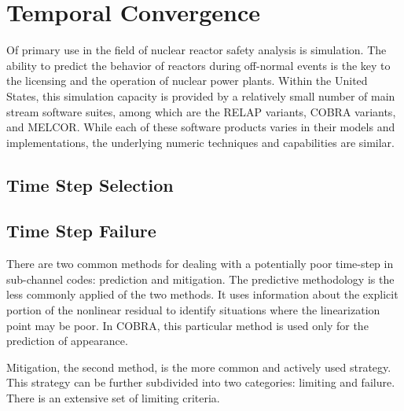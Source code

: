 \section{Temporal Convergence}
\label{sect:temporal_convergence}
Of primary use in the field of nuclear reactor safety analysis is simulation.
The ability to predict the behavior of reactors during off-normal events is the key to the licensing and the operation of nuclear power plants.
Within the United States, this simulation capacity is provided by a relatively small number of main stream software suites, among which are the RELAP variants, COBRA variants, and MELCOR.
While each of these software products varies in their models and implementations, the underlying numeric techniques and capabilities are similar.

\subsection{Time Step Selection}
\label{subsect:time_step_selection}

\subsection{Time Step Failure}
\label{subsect:time_step_failure}
There are two common methods for dealing with a potentially poor time-step in sub-channel codes: prediction and mitigation.
The predictive methodology is the less commonly applied of the two methods.
It uses information about the explicit portion of the nonlinear residual to identify situations where the linearization point may be poor.
In COBRA, this particular method is used only for the prediction of \ncg appearance.

Mitigation, the second method, is the more common and actively used strategy.
This strategy can be further subdivided into two categories: limiting and failure.
There is an extensive set of limiting criteria.
